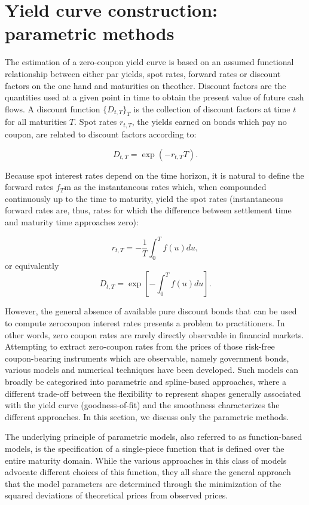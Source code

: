 \section{Yield curve construction: parametric methods}

The estimation of a zero-coupon yield curve is based on an assumed functional
relationship between either par yields, spot rates, forward rates or discount 
factors on the one hand and maturities on theother. Discount factors are the 
quantities used at a given point in time to obtain the present value of
future cash flows. A discount function $\{D_{t,T}\}_T$ is the collection of 
discount factors at time $t$ for all maturities $T$. Spot rates $r_{t,T}$, the 
yields earned on bonds which pay no coupon, are related to discount factors
according to:

\begin{equation}
  D_{t,T} = \exp(-r_{t,T} T).
\end{equation}

Because spot interest rates depend on the time horizon, it is natural to define
the forward rates $f_T$m as the instantaneous rates which, when compounded 
continuously up to the time to maturity, yield the spot rates (instantaneous 
forward rates are, thus, rates for which the difference between settlement
time and maturity time approaches zero):

\begin{equation}
  r_{t,T} = -\frac{1}{T} \int_0^T f(u) du,
\end{equation}
or equivalently
\begin{equation}
  D_{t,T} = \exp \left[ -\int_0^T f(u) du \right].
\end{equation}

However, the general absence of available pure discount bonds that can be used
to compute zerocoupon interest rates presents a problem to practitioners. In
other words, zero coupon rates are rarely directly observable in financial 
markets. Attempting to extract zero-coupon rates from the prices of
those risk-free coupon-bearing instruments which are observable, namely
government bonds, various models and numerical techniques have been developed. 
Such models can broadly be categorised into parametric and spline-based 
approaches, where a different trade-off between the flexibility to
represent shapes generally associated with the yield curve (goodness-of-fit) 
and the smoothness characterizes the different approaches. 
In this section, we discuss only the parametric methods.

The underlying principle of parametric models, also referred to as
function-based models, is the specification of a single-piece function that 
is defined over the entire maturity domain. While the various approaches 
in this class of models advocate different choices of this function, they 
all share the general approach that the model parameters are determined 
through the minimization of the squared deviations of theoretical prices 
from observed prices.
